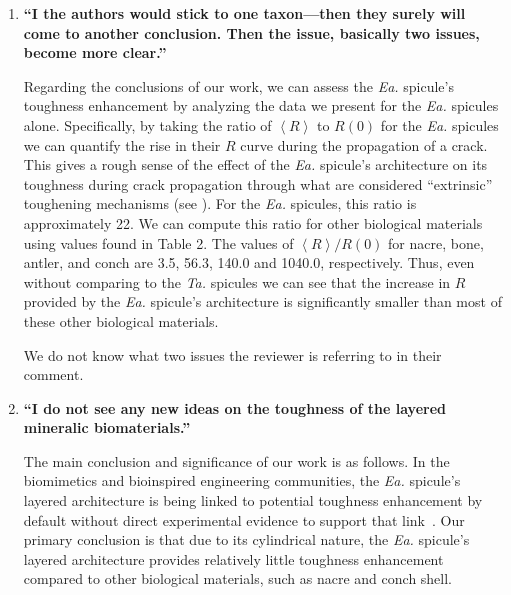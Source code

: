 \documentclass[11pt,letterpaper]{report}
\makeatletter
\newcommand{\TA}{\textit{Ta.\@}\xspace}
\newcommand{\EA}{\textit{Ea.\@}\xspace}
\makeatother
\begin{document}
\begin{enumerate}[label=\textit{3.\arabic*},wide, labelwidth=!, labelindent=0pt]
We agree with the Reviewer that differences in spiculogenesis between hexactinellids and demosponges will cause structural differences between the \EA and \TA spicules. We believe that this work constitutes a substantial improvement over past works focusing on toughness because it is the first to compare the \EA spicules to spicules from a related sponge instead of to synthetic glass. We hope that this work will motivate the importance of continuing to seek better control materials for comparison, such as sections of the \EA spicule core.

\item \label{r3c3} {\bf ``I the authors would stick to one taxon---then they surely will come to another conclusion. Then the issue, basically two issues, become more clear.''}

Regarding the conclusions of our work, we can assess the \EA spicule's toughness enhancement by analyzing the data we present for the \EA spicules alone. Specifically, by taking the ratio of $\left< R\right>$ to $R(0)$ for the \EA spicules we can quantify the rise in their $R$ curve during the propagation of a crack. This gives a rough sense of the effect of the \EA spicule's architecture on its toughness during crack propagation through what are considered ``extrinsic'' toughening mechanisms (see \cite{evans1990perspective}). For the \EA spicules, this ratio is approximately 22. We can compute this ratio for other biological materials using values found in Table 2. The values of $\left< R\right>/R(0)$ for nacre, bone, antler, and conch are 3.5, 56.3, 140.0 and 1040.0, respectively. Thus, even without comparing to the \TA spicules we can see that the increase in $R$ provided by the \EA spicule's architecture is significantly smaller than most of these other biological materials.

We do not know what two issues the reviewer is referring to in their comment.

\item \label{r3c4} {\bf ``I do not see any new ideas on the toughness of the layered mineralic biomaterials.''}

The main conclusion and significance of our work is as follows. In the biomimetics and bioinspired engineering communities, the \EA spicule's layered architecture is being linked to potential toughness enhancement by default without direct experimental evidence to support that link~\cite{mayer2011new, mayer2005rigid, kolednik2011bioinspired, walter2007mechanisms}. Our primary conclusion is that due to its cylindrical nature, the \EA spicule's layered architecture provides relatively little toughness enhancement compared to other biological materials, such as nacre and conch shell.


\end{enumerate}
\end{document}
